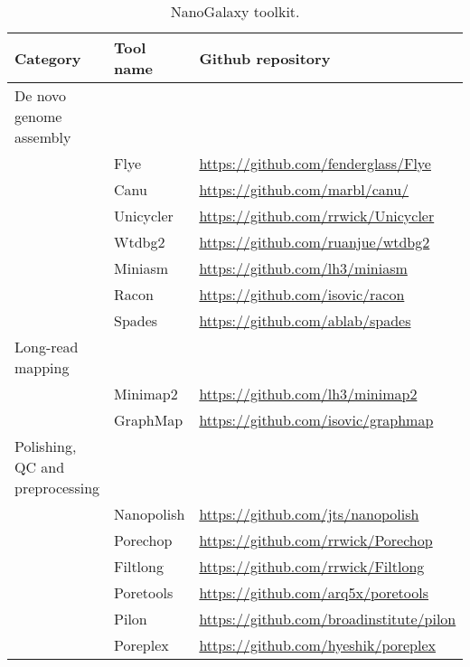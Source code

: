 \documentclass[a4paper,num-refs]{oup-contemporary}
\begin{document}
\begin{table*}[b!]
\caption{NanoGalaxy toolkit.}\label{tab:NanoGalaxyToolkit}
\begin{tabular}{l l l}
\toprule
Category & Tool name & Github repository\\
\midrule
De novo genome assembly         &            &                                         \\
                                & Flye       & \url{https://github.com/fenderglass/Flye}     \\
                                & Canu       & \url{https://github.com/marbl/canu/}          \\
                                & Unicycler  & \url{https://github.com/rrwick/Unicycler}     \\
                                & Wtdbg2     & \url{https://github.com/ruanjue/wtdbg2}       \\
                                & Miniasm    & \url{https://github.com/lh3/miniasm}          \\
                                & Racon      & \url{https://github.com/isovic/racon}         \\
                                & Spades     & \url{https://github.com/ablab/spades}         \\
Long-read mapping               &            &                                               \\
                                & Minimap2   & \url{https://github.com/lh3/minimap2}         \\
                                & GraphMap   & \url{https://github.com/isovic/graphmap}      \\
Polishing, QC and preprocessing &            &                                               \\
                                & Nanopolish & \url{https://github.com/jts/nanopolish}       \\
                                & Porechop   & \url{https://github.com/rrwick/Porechop}      \\
                                & Filtlong   & \url{https://github.com/rrwick/Filtlong}      \\
                                & Poretools  & \url{https://github.com/arq5x/poretools}      \\
                                & Pilon      & \url{https://github.com/broadinstitute/pilon} \\
                                & Poreplex   & \url{https://github.com/hyeshik/poreplex}     \\

\end{tabular}
\end{table*}
\end{document}
